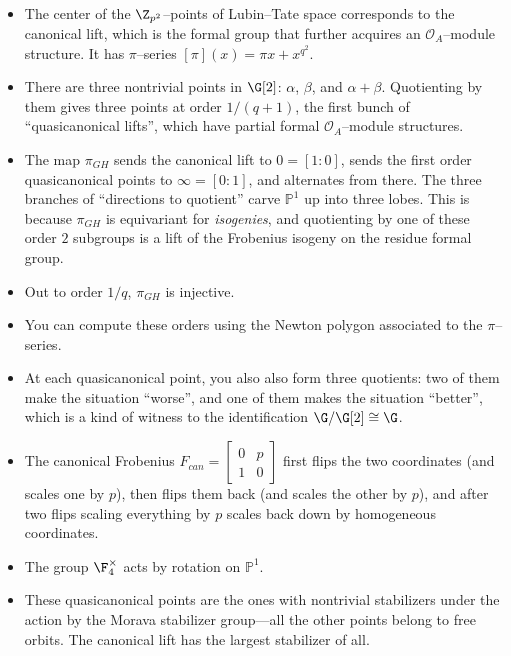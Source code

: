 \begin{remark}
\begin{itemize}
\item The center of the $\Z_{p^2}$--points of Lubin--Tate space corresponds to the canonical lift, which is the formal group that further acquires an $\mathcal O_A$--module structure.  It has $\pi$--series $[\pi](x) = \pi x + x^{q^2}$.
\item There are three nontrivial points in $\G[2]$: $\alpha$, $\beta$, and $\alpha + \beta$.  Quotienting by them gives three points at order $1/(q+1)$, the first bunch of ``quasicanonical lifts'', which have partial formal $\mathcal O_A$--module structures.
\item The map $\pi_{GH}$ sends the canonical lift to $0 = [1:0]$, sends the first order quasicanonical points to $\infty = [0:1]$, and alternates from there.  The three branches of ``directions to quotient'' carve $\mathbb P^1$ up into three lobes.  This is because $\pi_{GH}$ is equivariant for \emph{isogenies}, and quotienting by one of these order $2$ subgroups is a lift of the Frobenius isogeny on the residue formal group.
\item Out to order $1/q$, $\pi_{GH}$ is injective.
\item You can compute these orders using the Newton polygon associated to the $\pi$--series.
\item At each quasicanonical point, you also also form three quotients: two of them make the situation ``worse'', and one of them makes the situation ``better'', which is a kind of witness to the identification $\G / \G[2] \cong \G$.
\item The canonical Frobenius $F_{can} = \left[ \begin{array}{cc} 0 & p \\ 1 & 0 \end{array} \right]$ first flips the two coordinates (and scales one by $p$), then flips them back (and scales the other by $p$), and after two flips scaling everything by $p$ scales back down by homogeneous coordinates.
\item The group $\F_4^\times$ acts by rotation on $\mathbb P^1$.
\item These quasicanonical points are the ones with nontrivial stabilizers under the action by the Morava stabilizer group---all the other points belong to free orbits.  The canonical lift has the largest stabilizer of all.
\end{itemize}
\end{remark}

